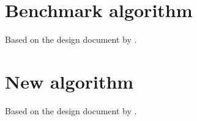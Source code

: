 \documentclass[british,10pt,a4paper]{article}
\begin{document}


\clearpage
\begin{appendices}

	\section{Benchmark algorithm}\label{app:approach1}
	Based on the design document by \citet{Ehlis2000-sz}. \newline
	
  	\clearpage	

	\section{New algorithm}\label{app:approach4}
	Based on the design document by \citet{Ehlis2000-sz}. \newline
	
  	\clearpage	

\end{appendices}
\clearpage
\end{document}
